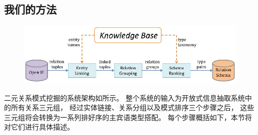 

\subsection{我们的方法}
\label{sec:tinf-approach}

%
%

\begin{figure}[htp]
    \centering
    \includegraphics[width=0.9\columnwidth]{figure/tinf/tinf_approach-crop.eps}
    \label{fig:tinf-workflow}
\end{figure}

二元关系模式挖掘的系统架构如所示。
整个系统的输入为开放式信息抽取系统中的所有关系三元组，
经过实体链接、关系分组以及模式排序三个步骤之后，
这些三元组将会转换为一系列排好序的主宾语类型搭配。
每个步骤概括如下，本节将对它们进行具体描述。

